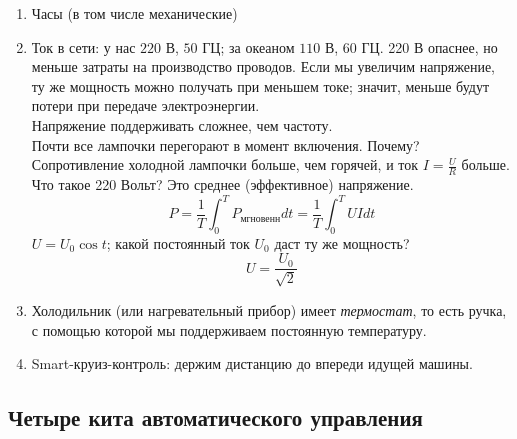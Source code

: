 \documentclass[main.tex]{subfiles}
\begin{document}
\begin{enumerate}[noitemsep]
    \item Часы (в том числе механические)
    \item Ток в сети: у нас $220$ В, $50$ ГЦ; за океаном $110$ В, $60$ ГЦ. 220 В опаснее, но меньше затраты на производство проводов. Если мы увеличим напряжение, ту же мощность можно получать при меньшем токе; значит, меньше будут потери при передаче электроэнергии. \\
    Напряжение поддерживать сложнее, чем частоту. \\
    Почти все лампочки перегорают в момент включения. Почему? Сопротивление холодной лампочки больше, чем горячей, и ток  $ I = \frac{U}{R} $ больше. \\
    Что такое 220 Вольт? Это среднее (эффективное) напряжение.
    $$ P = \frac{1}{T} \int_0^T P_{\text{мгновенн}} dt = \frac{1}{T} \int_{0}^{T} U I dt $$
    $ U = U_0 \cos t $; какой постоянный ток $ U_0 $ даст ту же мощность?
    $$ U = \frac{U_0}{\sqrt 2} $$
    \item Холодильник (или нагревательный прибор) имеет \emph{термостат}, то есть ручка, с помощью которой мы поддерживаем постоянную температуру.
    \item Smart-круиз-контроль: держим дистанцию до впереди идущей машины.
\end{enumerate}

\subsection{Четыре кита автоматического управления}
\end{document}
